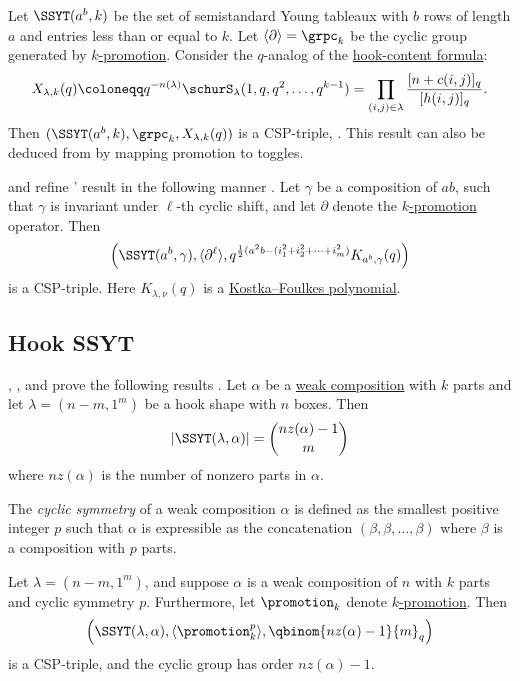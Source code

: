 Let $\SSYT(a^b,k)$ be the set of semistandard Young
tableaux with $b$ rows of length $a$ and entries less than
or equal to $k$.
Let $\langle \partial \rangle = \grpc_{k}$ be the cyclic group generated by \hyperref[kpromotion]{$k$-promotion}.
Consider the $q$-analog of the \hyperref[schurSpecializations]{hook-content formula}:
\[
X_{\lambda,k}(q) \coloneqq q^{-n(\lambda)} \schurS_\lambda(1,q,q^2,\dotsc,q^{k-1}) =
\prod_{(i,j) \in \lambda} \frac{[n+c(i,j)]_q}{ [h(i,j)]_q}.
\]
Then
$
(\SSYT(a^b,k), \grpc_{k}, X_{\lambda,k}(q))
$
is a CSP-triple, \cite{Rhoades2010}.
This result can also be deduced from \cite{ShenWeng2020}
by mapping promotion to toggles.


 and  refine
' result in the following manner
\cite{FontaineKamnitzer2013}.
Let $\gamma$ be a composition of $ab$, such that $\gamma$ is invariant
under $\ell$-th cyclic shift,
and let $\partial$ denote the \hyperref[kpromotion]{$k$-promotion} operator.
Then
\[
\left( \SSYT(a^b,\gamma), \langle \partial^\ell \rangle,
q^{\frac12(a^2 b- (i_1^2+i_2^2+\dotsb + i_m^2) } K_{a^b,\gamma}(q)
\right)
\]
is a CSP-triple.
Here $K_{\lambda,\nu}(q)$ is a \hyperref[kostkaFoulkes]{Kostka--Foulkes polynomial}.


\subsection[cspHookSSYT]{Hook SSYT}

, , and  prove the
following results \cite{BennettMadillStokke2014}.
Let $\alpha$ be a \hyperref[weakCompositionDefinition]{weak composition}
with $k$ parts
and let $\lambda = (n-m,1^m)$ be a hook shape with $n$ boxes.
Then
\[
|\SSYT(\lambda,\alpha)| = \binom{ nz(\alpha)-1}{m}
\]
where $nz(\alpha)$ is the number of nonzero parts in $\alpha$.

The \emph{cyclic symmetry} of a weak composition $\alpha$ is defined as
the smallest positive integer $p$ such that $\alpha$ is expressible as the concatenation
$(\beta,\beta,\dotsc,\beta)$ where $\beta$ is a composition with $p$ parts.

\begin{theorem}
Let $\lambda = (n-m,1^m)$, and suppose $\alpha$ is a weak composition of $n$
with $k$ parts and cyclic symmetry $p$.
Furthermore, let $\promotion_k$ denote \hyperref[kpromotion]{$k$-promotion}.
Then
\[
\left( \SSYT(\lambda,\alpha), \langle \promotion_k^p \rangle, \qbinom{ nz(\alpha)-1}{m}_q
\right)
\]
is a CSP-triple, and the cyclic group has order $nz(\alpha)-1$.
\end{theorem}



